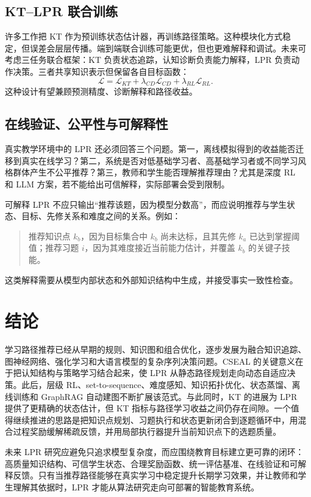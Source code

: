 \documentclass[UTF8,a4paper,zihao=-4]{ctexart}
\begin{document}
\subsection{KT--LPR 联合训练}

许多工作把 KT 作为预训练状态估计器，再训练路径策略。这种模块化方式稳定，但误差会层层传播。端到端联合训练可能更优，但也更难解释和调试。未来可考虑三任务联合框架：KT 负责状态追踪，认知诊断负责能力解释，LPR 负责动作决策。三者共享知识表示但保留各自目标函数：
\begin{equation}
\mathcal{L}=
\mathcal{L}_{KT}
+\lambda_{CD}\mathcal{L}_{CD}
+\lambda_{RL}\mathcal{L}_{RL}.
\end{equation}
这种设计有望兼顾预测精度、诊断解释和路径收益。

\subsection{在线验证、公平性与可解释性}

真实教学环境中的 LPR 还必须回答三个问题。第一，离线模拟得到的收益能否迁移到真实在线学习？第二，系统是否对低基础学习者、高基础学习者或不同学习风格群体产生不公平推荐？第三，教师和学生能否理解推荐理由？尤其是深度 RL 和 LLM 方案，若不能给出可信解释，实际部署会受到限制。

可解释 LPR 不应只输出“推荐该题，因为模型分数高”，而应说明推荐与学生状态、目标、先修关系和难度之间的关系。例如：
\begin{quote}
推荐知识点 $k_b$，因为目标集合中 $k_b$ 尚未达标，且其先修 $k_a$ 已达到掌握阈值；推荐习题 $i$，因为其难度接近当前能力估计，并覆盖 $k_b$ 的关键子技能。
\end{quote}
这类解释需要从模型内部状态和外部知识结构中生成，并接受事实一致性检查。

\section{结论}

学习路径推荐已经从早期的规则、知识图和组合优化，逐步发展为融合知识追踪、图神经网络、强化学习和大语言模型的复杂序列决策问题。CSEAL 的关键意义在于把认知结构与策略学习结合起来，使 LPR 从静态路径规划走向动态自适应决策。此后，层级 RL、set-to-sequence、难度感知、知识拓扑优化、状态蒸馏、离线训练和 GraphRAG 自动建图不断扩展该范式。与此同时，KT 的进展为 LPR 提供了更精确的状态估计，但 KT 指标与路径学习收益之间仍存在间隙。一个值得继续推进的思路是把知识点规划、习题执行和状态更新闭合到逐题循环中，用混合过程奖励缓解稀疏反馈，并用局部执行器提升当前知识点下的选题质量。

未来 LPR 研究应避免只追求模型复杂度，而应围绕教育目标建立更可靠的闭环：高质量知识结构、可信学生状态、合理奖励函数、统一评估基准、在线验证和可解释反馈。只有当推荐路径能够在真实学习中稳定提升长期学习效果，并让教师和学生理解其依据时，LPR 才能从算法研究走向可部署的智能教育系统。

\printbibliography[title={参考文献}]
\end{document}
